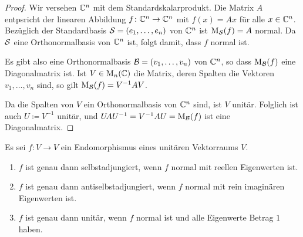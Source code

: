 \begin{proof}
  Wir versehen $\mathbb{C}^n$ mit dem Standardskalarprodukt.
  Die Matrix $A$ entpsricht der linearen Abbildung $f \colon \mathbb{C}^n \to \mathbb{C}^n$ mit $f(x) = Ax$ für alle $x \in \mathbb{C}^n$.
  Bezüglich der Standardbasis $\mathcal{S} = (e_1, \dotsc, e_n)$ von $\mathbb{C}^n$ ist $\mathrm{M}_{\mathcal{S}}(f) = A$ normal.
  Da $\mathcal{S}$ eine Orthonormalbasis von $\mathbb{C}^n$ ist, folgt damit, dass $f$ normal ist.
  
  Es gibt also eine Orthonormalbasis $\mathcal{B} = (v_1, \dotsc, v_n)$ von $\mathbb{C}^n$, so dass $\mathrm{M}_{\mathcal{B}}(f)$ eine Diagonalmatrix ist.
  Ist $V \in \mathrm{M}_n(\mathbb{C})$ die Matrix, deren Spalten die Vektoren $v_1, \dotsc, v_n$ sind, so gilt $\mathrm{M}_{\mathcal{B}}(f) = V^{-1} A V$.
  
  Da die Spalten von $V$ ein Orthonormalbasis von $\mathbb{C}^n$ sind, ist $V$ unitär.
  Folglich ist auch $U \coloneqq V^{-1}$ unitär, und $U\!A U^{-1} = V^{-1} A U = \mathrm{M}_{\mathcal{B}}(f)$ ist eine Diagonalmatrix.
\end{proof}


\begin{proposition}
  Es sei $f \colon V \to V$ ein Endomorphismus eines unitären Vektorraums $V$.
  \begin{enumerate}[leftmargin=*, label=\roman*)]
    \item
      $f$ ist genau dann selbstadjungiert, wenn $f$ normal mit reellen Eigenwerten ist.
    \item
      $f$ ist genau dann antiselbstadjungiert, wenn $f$ normal mit rein imaginären Eigenwerten ist.
    \item
      $f$ ist genau dann unitär, wenn $f$ normal ist und alle Eigenwerte Betrag $1$ haben.
  \end{enumerate}
\end{proposition}



